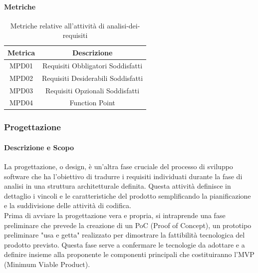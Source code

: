 \documentclass[10pt]{article}
\begin{document}
\begin{justify}
        \paragraph{Metriche}
        \begin{table}[H]
          \centering
          \begin{tabular}{|c|c|}
            \hline
            \textbf{Metrica} & \textbf{Descrizione} \\
            \hline
            MPD01 & Requisiti Obbligatori Soddisfatti\\
            \hline
            MPD02 & Requisiti Desiderabili Soddisfatti\\
            \hline
            MPD03 & Requisiti Opzionali Soddisfatti\\
            \hline
            MPD04 & Function Point\\
            \hline
          \end{tabular}
          \caption{Metriche relative all'attività di analisi-dei-requisiti}
        \end{table}

    \subsubsection{Progettazione}
    \label{progettazione}
        \paragraph{Descrizione e Scopo}
        La progettazione, o design, è un'altra fase cruciale del processo di sviluppo software che ha l'obiettivo di tradurre i requisiti individuati durante la fase di analisi in una struttura architetturale definita. Questa attività definisce in dettaglio i vincoli e le caratteristiche del prodotto semplificando la pianificazione e la suddivisione delle attività di codifica.\\
        Prima di avviare la progettazione vera e propria, si intraprende una fase preliminare che prevede la creazione di un PoC (Proof of Concept), un prototipo preliminare "usa e getta" realizzato per dimostrare la fattibilità tecnologica del prodotto previsto. Questa fase serve a confermare le tecnologie da adottare e a definire insieme alla proponente le componenti principali che costituiranno l'MVP (Minimum Viable Product).\\


\end{justify}
\end{document}
